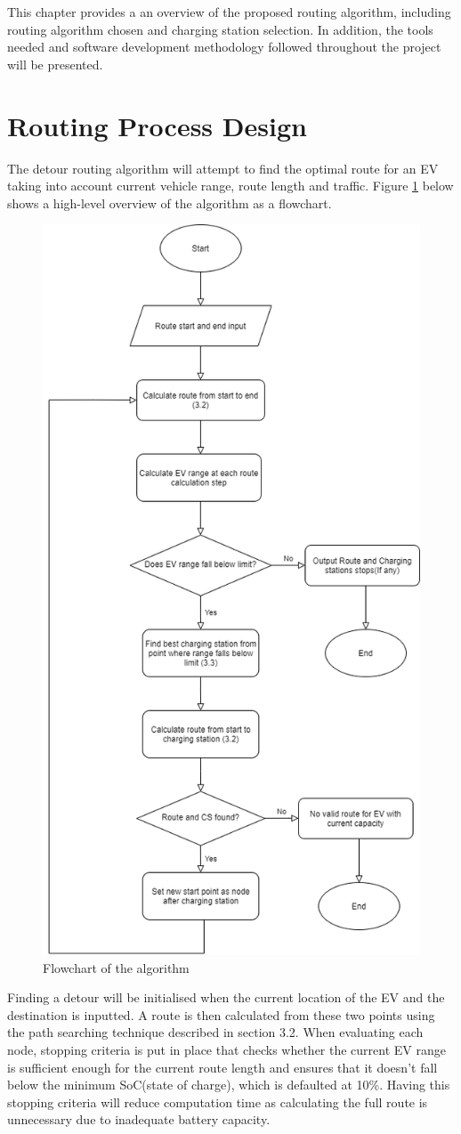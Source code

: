 \documentclass[11pt]{report}
\begin{document}
\newpage

\noindent This chapter provides a an overview of the proposed routing algorithm, including routing algorithm chosen and charging station selection. In addition, the tools needed and software development methodology followed throughout the project will be presented.

\section{Routing Process Design}

The detour routing algorithm will attempt to find the optimal route for an EV taking into account current vehicle range, route length and traffic. Figure \ref{fig:3} below shows a high-level overview of the algorithm as a flowchart.

\begin{figure}[h!]
  \centering
  \includegraphics[width=0.62\linewidth]{AlgFlow.png}
  \caption{Flowchart of the algorithm}
  \label{fig:3}
\end{figure}

Finding a detour will be initialised when the current location of the EV and the destination is inputted. A route is then calculated from these two points using the path searching technique described in section 3.2. When evaluating each node, stopping criteria is put in place that checks whether the current EV range is sufficient enough for the current route length and ensures that it doesn't fall below the minimum SoC(state of charge), which is defaulted at 10\%. Having this stopping criteria will reduce computation time as calculating the full route is unnecessary due to inadequate battery capacity. 
\end{document}
